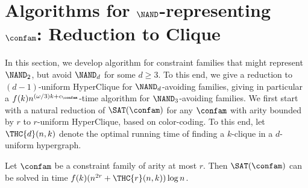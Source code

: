 \section{Algorithms for $\NAND$-representing $\confam$: Reduction to Clique}
\label{sec:redToClique}
%
In this section, we develop algorithm for constraint families that might represent $\NAND_2$, but avoid $\NAND_d$ for some $d\ge 3$. To this end, we give a reduction to $(d-1)$-uniform HyperClique for $\NAND_d$-avoiding families, giving in particular a $f(k)n^{(\omega/3)k+c_\confam}$-time algorithm for $\NAND_3$-avoiding families. 
%
We first start with a natural reduction of $\SAT(\confam)$ for any $\confam$ with arity bounded by $r$ to $r$-uniform HyperClique, based on color-coding. To this end, let $\THC{d}(n,k)$ denote the optimal running time of finding a $k$-clique in a $d$-uniform hypergraph.
\begin{prop}\label{prop:aritybaseline}
Let $\confam$ be a constraint family of arity at most $r$. Then $\SAT(\confam)$ can be solved in time $f(k)(n^{2r} + \THC{r}(n,k))\log n$.
\end{prop}
